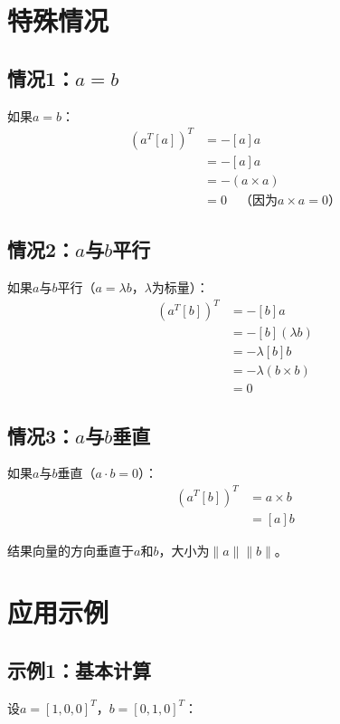 \documentclass[12pt,a4paper]{article}
\begin{document}
\section{特殊情况}

\subsection{情况1：$a = b$}

如果$a = b$：
\begin{align}
(a^T [a])^T &= -[a] a \\
&= -[a] a \\
&= -(a \times a) \\
&= 0 \quad \text{（因为$a \times a = 0$）}
\end{align}

\subsection{情况2：$a$与$b$平行}

如果$a$与$b$平行（$a = \lambda b$，$\lambda$为标量）：
\begin{align}
(a^T [b])^T &= -[b] a \\
&= -[b] (\lambda b) \\
&= -\lambda [b] b \\
&= -\lambda (b \times b) \\
&= 0
\end{align}

\subsection{情况3：$a$与$b$垂直}

如果$a$与$b$垂直（$a \cdot b = 0$）：
\begin{align}
(a^T [b])^T &= a \times b \\
&= [a] b
\end{align}

结果向量的方向垂直于$a$和$b$，大小为$\|a\| \|b\|$。

\section{应用示例}

\subsection{示例1：基本计算}

设$a = [1, 0, 0]^T$，$b = [0, 1, 0]^T$：
\end{document}
